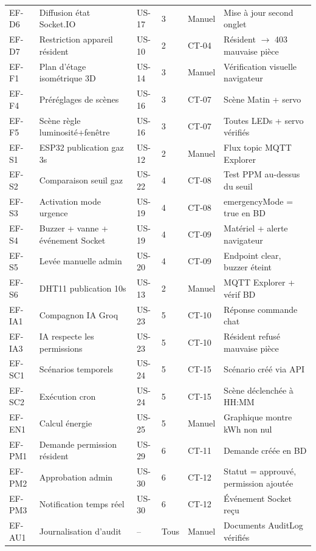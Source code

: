 \begin{center}
\begin{longtable}{p{} p{} p{} p{} p{} p{}}
EF-D6  & Diffusion état Socket.IO        & US-17    & 3 & Manuel& Mise à jour second onglet \\
EF-D7  & Restriction appareil résident   & US-10    & 2 & CT-04 & Résident $\to$ 403 mauvaise pièce \\
EF-F1  & Plan d'étage isométrique 3D     & US-14    & 3 & Manuel& Vérification visuelle navigateur \\
EF-F4  & Préréglages de scènes           & US-16    & 3 & CT-07 & Scène Matin + servo \\
EF-F5  & Scène règle luminosité+fenêtre  & US-16    & 3 & CT-07 & Toutes LEDs + servo vérifiés \\
EF-S1  & ESP32 publication gaz 3s        & US-12    & 2 & Manuel& Flux topic MQTT Explorer \\
EF-S2  & Comparaison seuil gaz           & US-22    & 4 & CT-08 & Test PPM au-dessus du seuil \\
EF-S3  & Activation mode urgence         & US-19    & 4 & CT-08 & emergencyMode = true en BD \\
EF-S4  & Buzzer + vanne + événement Socket & US-19  & 4 & CT-09 & Matériel + alerte navigateur \\
EF-S5  & Levée manuelle admin            & US-20    & 4 & CT-09 & Endpoint clear, buzzer éteint \\
EF-S6  & DHT11 publication 10s           & US-13    & 2 & Manuel& MQTT Explorer + vérif BD \\
EF-IA1 & Compagnon IA Groq               & US-23    & 5 & CT-10 & Réponse commande chat \\
EF-IA3 & IA respecte les permissions     & US-23    & 5 & CT-10 & Résident refusé mauvaise pièce \\
EF-SC1 & Scénarios temporels             & US-24    & 5 & CT-15 & Scénario créé via API \\
EF-SC2 & Exécution cron                  & US-24    & 5 & CT-15 & Scène déclenchée à HH:MM \\
EF-EN1 & Calcul énergie                  & US-25    & 5 & Manuel& Graphique montre kWh non nul \\
EF-PM1 & Demande permission résident     & US-29    & 6 & CT-11 & Demande créée en BD \\
EF-PM2 & Approbation admin               & US-30    & 6 & CT-12 & Statut = approuvé, permission ajoutée \\
EF-PM3 & Notification temps réel         & US-30    & 6 & CT-12 & Événement Socket reçu \\
EF-AU1 & Journalisation d'audit          & --       & Tous & Manuel & Documents AuditLog vérifiés \\

\end{longtable}
\end{center}
